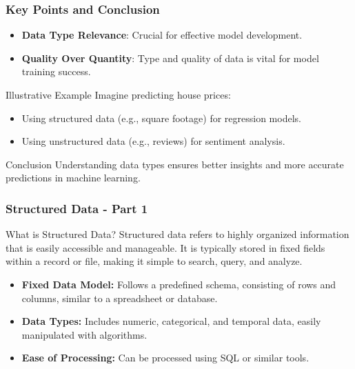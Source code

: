 \documentclass[aspectratio=169]{beamer}
\begin{document}
\begin{frame}[fragile]
    \frametitle{Key Points and Conclusion}
    \begin{itemize}
        \item \textbf{Data Type Relevance}: Crucial for effective model development.
        \item \textbf{Quality Over Quantity}: Type and quality of data is vital for model training success.
    \end{itemize}
    \begin{block}{Illustrative Example}
        Imagine predicting house prices:
        \begin{itemize}
            \item Using structured data (e.g., square footage) for regression models.
            \item Using unstructured data (e.g., reviews) for sentiment analysis.
        \end{itemize}
    \end{block}
    \begin{block}{Conclusion}
        Understanding data types ensures better insights and more accurate predictions in machine learning.
    \end{block}
\end{frame}

\begin{frame}[fragile]
    \frametitle{Structured Data - Part 1}
    \begin{block}{What is Structured Data?}
        Structured data refers to highly organized information that is easily accessible and manageable. It is typically stored in fixed fields within a record or file, making it simple to search, query, and analyze.
    \end{block}
    \begin{itemize}
        \item \textbf{Fixed Data Model:} Follows a predefined schema, consisting of rows and columns, similar to a spreadsheet or database.
        \item \textbf{Data Types:} Includes numeric, categorical, and temporal data, easily manipulated with algorithms.
        \item \textbf{Ease of Processing:} Can be processed using SQL or similar tools.
    \end{itemize}
\end{frame}
\end{document}
